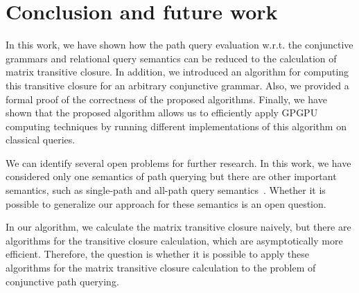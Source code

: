 \section{Conclusion and future work} \label{section_conclusion}
In this work, we have shown how the path query evaluation w.r.t. the conjunctive grammars and relational query semantics can be reduced to the calculation of matrix transitive closure. In addition, we introduced an algorithm for computing this transitive closure for an arbitrary conjunctive grammar. Also, we provided a formal proof of the correctness of the proposed algorithms. Finally, we have shown that the proposed algorithm allows us to efficiently apply GPGPU computing techniques by running different implementations of this algorithm on classical queries. 

We can identify several open problems for further research. In this work, we have considered only one semantics of path querying but there are other important semantics, such as single-path and all-path query semantics~\cite{hellingsPathQuerying}. Whether it is possible to generalize our approach for these semantics is an open question.

In our algorithm, we calculate the matrix transitive closure naively, but there are algorithms for the transitive closure calculation, which are asymptotically more efficient. Therefore, the question is whether it is possible to apply these algorithms for the matrix transitive closure calculation to the problem of conjunctive path querying.

